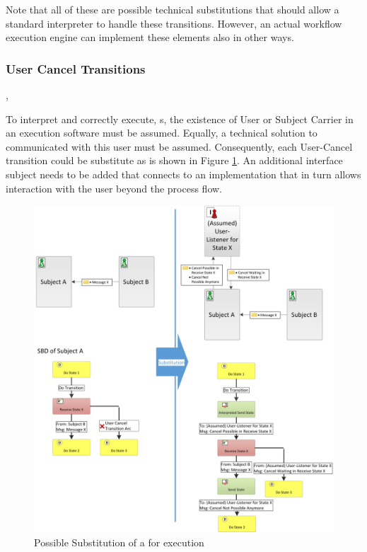 Note that all of these are possible technical substitutions that should allow a standard interpreter to handle these transitions. However, an actual workflow execution engine can implement these elements also in other ways.

\subsubsection{User Cancel Transitions},

To interpret and correctly execute, s, the existence of User or Subject Carrier in an execution software must be assumed. Equally, a technical solution to communicated with this user must be assumed. Consequently, each User-Cancel transition could be substitute as is shown in Figure \ref{fig:usercancelSubstitution}. An additional interface subject needs to be added that connects to an implementation that in turn allows interaction with the user beyond the process flow. 


\begin{figure}[hp]
	\centering
	\includegraphics[width=1.0\linewidth]{Figures/Ontology/UserCancelInterpretationSIDSBD.png}
	\caption[Possible Substitution of a  for execution]{Possible Substitution of a  for execution}
	\label{fig:usercancelSubstitution}
\end{figure}

